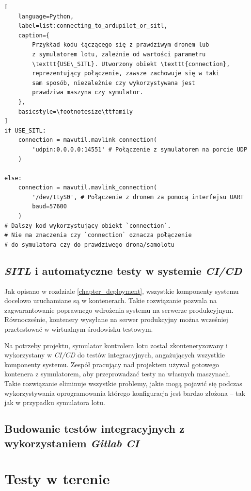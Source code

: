 \begin{lstlisting}[
    language=Python,
    label=list:connecting_to_ardupilot_or_sitl,
    caption={
        Przykład kodu łączącego się z prawdziwym dronem lub 
        z symulatorem lotu, zależnie od wartości parametru
        \texttt{USE\_SITL}. Utworzony obiekt \texttt{connection},
        reprezentujący połączenie, zawsze zachowuje się w taki
        sam sposób, niezależnie czy wykorzystywana jest
        prawdziwa maszyna czy symulator. 
    },
    basicstyle=\footnotesize\ttfamily
]
if USE_SITL:
    connection = mavutil.mavlink_connection(
        'udpin:0.0.0.0:14551' # Połączenie z symulatorem na porcie UDP
    )

else:    
    connection = mavutil.mavlink_connection(
        '/dev/ttyS0', # Połączenie z dronem za pomocą interfejsu UART
        baud=57600
    )
# Dalszy kod wykorzystujący obiekt `connection`.
# Nie ma znaczenia czy `connection` oznacza połączenie
# do symulatora czy do prawdziwego drona/samolotu
\end{lstlisting}

\subsection{\textit{SITL} i automatyczne testy w systemie \textit{CI/CD}}

Jak opisano w rozdziale \ref{chapter_deployment}, wszystkie komponenty systemu
docelowo uruchamiane są w kontenerach. Takie rozwiązanie pozwala na zagwarantowanie
poprawnego wdrożenia systemu na serwerze produkcyjnym. Równocześnie, kontenery wysyłane
na serwer produkcyjny można wcześniej przetestować w wirtualnym środowisku testowym.

Na potrzeby projektu, symulator kontrolera lotu został zkonteneryzowany i wykorzystany
w \textit{CI/CD} do testów integracyjnych, angażujących wszystkie komponenty systemu.
Zespół pracujący nad projektem używał gotowego kontenera z symulatorem,
aby przeprowadzać testy na własnych maszynach. Takie rozwiązanie eliminuje wszystkie
problemy, jakie mogą pojawić się podczas wykorzystywania oprogramowania którego
konfiguracja jest bardzo złożona -- tak jak w przypadku symulatora lotu.

\subsection{Budowanie testów integracyjnych z wykorzystaniem \textit{Gitlab CI}}

\section{Testy w terenie}

